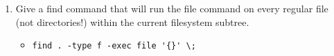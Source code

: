 \documentclass[12pt, letterpaper]{article}
\begin{document}
\begin{enumerate}
\begin{itemize}
		\end{itemize}
	\item Give a find command that will run the file command on every regular file (not directories!) within the current filesystem subtree. \hfill
		\begin{itemize}
			\item \verb|find . -type f -exec file '{}' \;|
		\end{itemize}
\end{enumerate}
		
\end{document}
